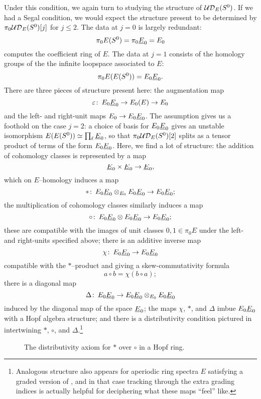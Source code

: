 Under this condition, we again turn to studying the structure of \(\mathcal{UD}_E(S^0)\).  If we had a Segal condition, we would expect the structure present to be determined by \(\pi_0 \mathcal{UD}_E(S^0)[j]\) for \(j \le 2\).  The data at \(j = 0\) is largely redundant: \[\pi_0 E(S^0) = \pi_0 \underline{\smash{E}}_{0} = E_0\] computes the coefficient ring of \(E\).  The data at \(j = 1\) consists of the homology groups of the the infinite loopspace associated to \(E\): \[\pi_0 E(E(S^0)) = E_0 \underline{\smash{E}}_{0}.\]  There are three pieces of structure present here: the augmentation map \[\varepsilon\colon\thinspace E_0 \underline{\smash{E}}_{0} \to E_0(E) \to E_0\] and the left- and right-unit maps \(E_0 \to E_0 \underline{\smash{E}}_{0}\).  The assumption {\UFH} gives us a foothold on the case \(j = 2\): a choice of basis for \(E_0 \underline{\smash{E}}_{0}\) gives an unstable isomorphism \(E(E(S^0)) \simeq \prod_\ell \underline{\smash{E}}_{0}\), so that \(\pi_0 \mathcal{UD}_E(S^0)[2]\) splits as a tensor product of terms of the form \(E_0 \underline{\smash{E}}_{0}\).  Here, we find a lot of structure: the addition of cohomology classes is represented by a map \[\underline{\smash{E}}_{0} \times \underline{\smash{E}}_{0} \to \underline{\smash{E}}_{0},\] which on \(E\)--homology induces a map \[\ast\colon\thinspace E_0 \underline{\smash{E}}_{0} \otimes_{E_0} E_0 \underline{\smash{E}}_{0} \to E_0 \underline{\smash{E}}_{0};\] the multiplication of cohomology classes similarly induces a map \[\circ\colon\thinspace E_0 \underline{\smash{E}}_{0} \otimes E_0 \underline{\smash{E}}_{0} \to E_0 \underline{\smash{E}}_{0};\] these are compatible with the images of unit classes \(0, 1 \in \pi_0 E\) under the left- and right-units specified above; there is an additive inverse map \[\chi\colon\thinspace E_0 \underline{\smash{E}}_{0} \to E_0 \underline{\smash{E}}_{0}\] compatible with the \(\ast\)--product and giving a skew-commutativity formula \[a \circ b = \chi(b \circ a);\] there is a diagonal map \[\Delta\colon\thinspace E_0 \underline{\smash{E}}_{0} \to E_0 \underline{\smash{E}}_{0} \otimes_{E_0} E_0 \underline{\smash{E}}_{0}\] induced by the diagonal map of the space $\underline{\smash{E}}_{0}$; the maps \(\chi\), \(\ast\), and \(\Delta\) imbue \(E_0 \underline{\smash{E}}_{0}\) with a Hopf algebra structure; and there is a distributivity condition pictured in  intertwining \(\ast\), \(\circ\), and \(\Delta\).\footnote{Analogous structure also appears for aperiodic ring spectra \(E\) satisfying a graded version of {\UFH}, and in that case tracking through the extra grading indices is actually helpful for deciphering what these maps ``feel'' like.}

\begin{figure}
\begin{center}
\end{center}
\caption{The distributivity axiom for \(\ast\) over \(\circ\) in a Hopf ring.}\label{DistributivityDiagram}
\end{figure}

